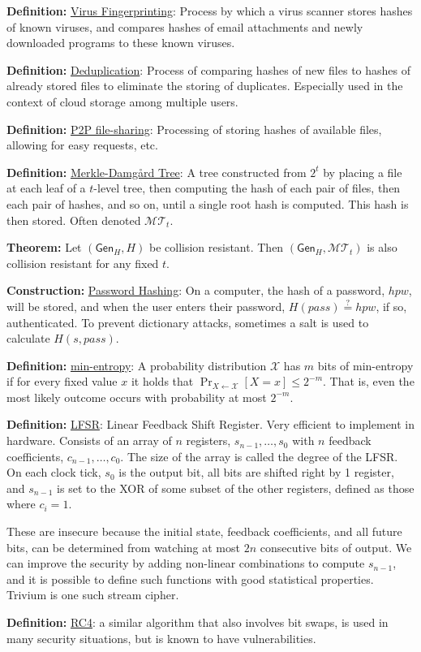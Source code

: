 \documentclass[12pt]{article}
\newcommand{\MMM}{\mathcal{M}}
\newcommand{\XXX}{\mathcal{X}}
\newcommand{\TTT}{\mathcal{T}}
\newcommand{\defn}[1]{{\bf Definition:} \underline{#1}}
\newcommand{\thm}[1]{{\bf Theorem:} \underline{#1}}
\newcommand{\con}[1]{{\bf Construction:} \underline{#1}}
\newcommand{\Gen}{\mathsf{Gen}}
\newcommand{\from}{\leftarrow}
\begin{document}
\begin{multicols}{2}
\defn{Virus Fingerprinting}: Process by which a virus scanner stores hashes of known viruses, and compares hashes of email attachments and newly downloaded programs to these known viruses.

\defn{Deduplication}: Process of comparing hashes of new files to hashes of already stored files to eliminate the storing of duplicates. Especially used in the context of cloud storage among multiple users.

\defn{P2P file-sharing}: Processing of storing hashes of available files, allowing for easy requests, etc.

\defn{Merkle-Damg\r{a}rd Tree}: A tree constructed from $2^t$ by placing a file at each leaf of a $t$-level tree, then computing the hash of each pair of files, then each pair of hashes, and so on, until a single root hash is computed. This hash is then stored. Often denoted $\MMM\TTT_t$.

\thm{}Let $(\Gen_H,H)$ be collision resistant. Then $(\Gen_H,\MMM\TTT_t)$ is also collision resistant for any fixed $t$.

\con{Password Hashing}: On a computer, the hash of a password, $hpw$, will be stored, and when the user enters their password, $H(pass)\overset{?}{=}hpw$, if so, authenticated. To prevent dictionary attacks, sometimes a salt is used to calculate $H(s,pass)$.

\defn{min-entropy}: A probability distribution $\XXX$ has $m$ bits of min-entropy if for every fixed value $x$ it holds that $\Pr_{X\from\XXX}[X=x]\leq2^{-m}$. That is, even the most likely outcome occurs with probability at most $2^{-m}$.

\defn{LFSR}: Linear Feedback Shift Register. Very efficient to implement in hardware. Consists of an array of $n$ registers, $s_{n-1},\dots,s_0$ with $n$ feedback coefficients, $c_{n-1},\dots,c_0$. The size of the array is called the degree of the LFSR. On each clock tick, $s_0$ is the output bit, all bits are shifted right by 1 register, and $s_{n-1}$ is set to the XOR of some subset of the other registers, defined as those where $c_i=1$.

These are insecure because the initial state, feedback coefficients, and all future bits, can be determined from watching at most $2n$ consecutive bits of output. We can improve the security by adding non-linear combinations to compute $s_{n-1}$, and it is possible to define such functions with good statistical properties. Trivium is one such stream cipher.

\defn{RC4}: a similar algorithm that also involves bit swaps, is used in many security situations, but is known to have vulnerabilities.


\end{multicols}
\end{document}
